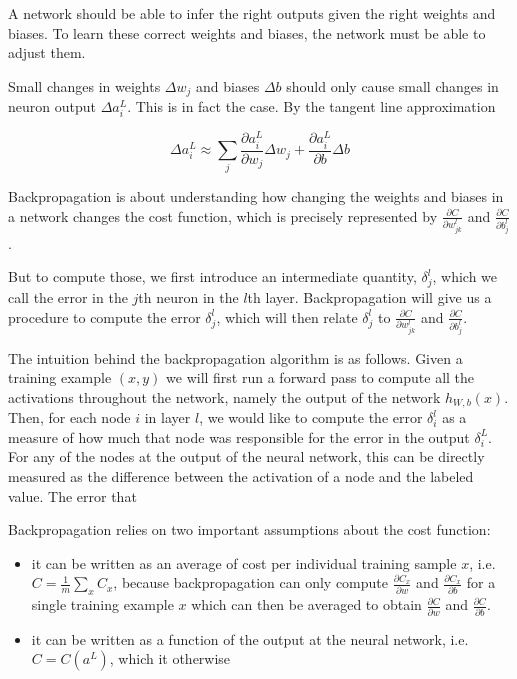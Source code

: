 A network should be able to infer the right outputs given the right weights and biases. To learn these correct weights and biases, the network must be able to adjust them.

Small changes in weights $\Delta w_j$ and biases $\Delta b$ should only cause small changes in neuron output $\Delta a^L_i$. This is in fact the case. By the tangent line approximation

$$
\Delta a^L_i \approx \sum_j \frac{\partial a^L_i}{\partial w_j} \Delta w_j + \frac{\partial a^L_i}{\partial b} \Delta b
$$

Backpropagation is about understanding how changing the weights and biases in a network changes the cost function, which is precisely represented by $\frac{\partial C}{\partial w^l_{jk}}$ and $\frac{\partial C}{\partial b^l_j}$.

But to compute those, we first introduce an intermediate quantity, $\delta^l_j$, which we call the error in the $j$th neuron in the $l$th layer. Backpropagation will give us a procedure to compute the error $\delta^l_j$, which will then relate $\delta^l_j$ to $\frac{\partial C}{\partial w^l_{jk}}$ and $\frac{\partial C}{\partial b^l_j}$.



The intuition behind the backpropagation algorithm is as follows. Given a training example $(x, y)$ we will first run a forward pass to compute all the activations throughout the network, namely the output of the network $h_{W,b}(x)$. Then, for each node $i$ in layer $l$, we would like to compute the error $\delta^{l}_i$ as a measure of how much that node was responsible for the error in the output $\delta^{L}_i$. For any of the nodes at the output of the neural network, this can be directly measured as the difference between the activation of a node and the labeled value.
The error that

Backpropagation relies on two important assumptions about the cost function:

\begin{itemize}
    \item it can be written as an average of cost per individual training sample $x$, i.e. $C = \frac{1}{m} \sum_x C_x$, because backpropagation can only compute $\frac{\partial C_x}{\partial w}$  and $\frac{\partial C_x}{\partial b}$ for a single training example $x$ which can then be averaged to obtain $\frac{\partial C}{\partial w}$  and $\frac{\partial C}{\partial b}$.
    \item it can be written as a function of the output at the neural network, i.e. $C = C(a^{L})$, which it otherwise
\end{itemize}


